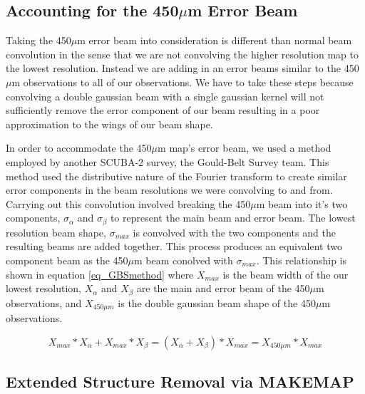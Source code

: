 
\subsection{Accounting for the 450$\mu$m Error Beam}\label{450_fix_sec}

Taking the 450$\mu$m error beam into consideration is different than normal beam convolution in the sense that we are not convolving the higher resolution map to the lowest resolution.  Instead we are adding in an error beams similar to the 450$\mu$m observations to all of our observations.  We have to take these steps because convolving a double gaussian beam with a single gaussian kernel will not sufficiently remove the error component of our beam resulting in a poor approximation to the wings of our beam shape.

In order to accommodate the 450$\mu$m map's error beam, we used a method employed by another SCUBA-2 survey, the Gould-Belt Survey team.  This method used the distributive nature of the Fourier transform to create similar error components in the beam resolutions we were convolving to and from.  Carrying out this convolution involved breaking the 450$\mu$m beam into it's two components, $\sigma_{\alpha}$ and $\sigma_{\beta}$ to represent the main beam and error beam.  The lowest resolution beam shape, $\sigma_{max}$ is convolved with the two components and the resulting beams are added together.  This process produces an equivalent two component beam as the 450$\mu$m beam conolved with $\sigma_{max}$.  This relationship is shown in equation \ref{eq_GBSmethod} where $X_{max}$ is the beam width of the our lowest resolution, $X_{\alpha}$ and $X_{\beta}$ are the main and error beam of the 450$\mu$m observations, and $X_{450\mu m}$ is the double gaussian beam shape of the 450$\mu$m observations.

\begin{equation} \label{eq_GBSmethod}
  X_{max} \ast X_{\alpha} + X_{max} \ast X_{\beta} = \left(X_{\alpha} + X_{\beta}\right) \ast X_{max} = X_{450\mu m} \ast X_{max}
\end{equation}

\subsection{Extended Structure Removal via MAKEMAP}\label{fakesource_sec}

